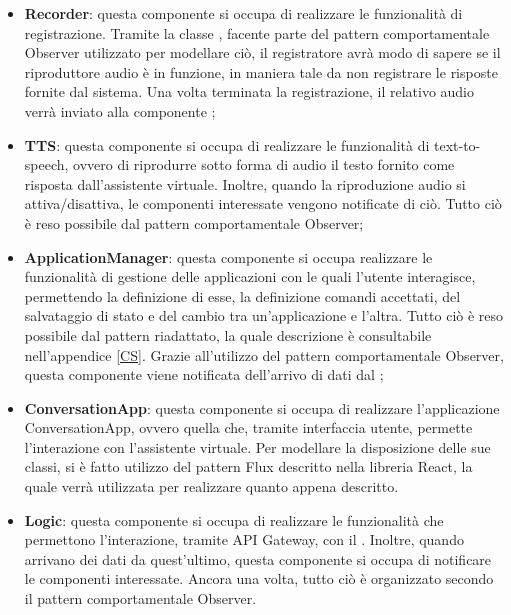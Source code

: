 \begin{itemize}
	\item \textbf{Recorder}: questa componente si occupa di realizzare le funzionalità di registrazione. Tramite la classe , facente parte del pattern comportamentale Observer utilizzato per modellare ciò, il registratore avrà modo di sapere se il riproduttore audio è in funzione, in maniera tale da non registrare le risposte fornite dal sistema. Una volta terminata la registrazione, il relativo audio verrà inviato alla componente ;
	\newpage
	\item \textbf{TTS}: questa componente si occupa di realizzare le funzionalità di text-to-speech, ovvero di riprodurre sotto forma di audio il testo fornito come risposta dall'assistente virtuale. Inoltre, quando la riproduzione audio si attiva/disattiva, le componenti interessate vengono notificate di ciò. Tutto ciò è reso possibile dal pattern comportamentale Observer;
	\item \textbf{ApplicationManager}: questa componente si occupa realizzare le funzionalità di gestione delle applicazioni con le quali l'utente interagisce, permettendo la definizione di esse, la definizione comandi accettati, del salvataggio di stato e del cambio tra un'applicazione e l'altra. Tutto ciò è reso possibile dal pattern  riadattato, la quale descrizione è consultabile nell'appendice \ref{CS}. Grazie all'utilizzo del pattern comportamentale Observer, questa componente viene notificata dell'arrivo di dati dal ;
	\item \textbf{ConversationApp}: questa componente si occupa di realizzare l'applicazione ConversationApp, ovvero quella che, tramite interfaccia utente, permette l'interazione con l'assistente virtuale. Per modellare la disposizione delle sue classi, si è fatto utilizzo del pattern Flux descritto nella libreria React, la quale verrà utilizzata per realizzare quanto appena descritto.
	\item \textbf{Logic}: questa componente si occupa di realizzare le funzionalità che permettono l'interazione, tramite API Gateway, con il . Inoltre, quando arrivano dei dati da quest'ultimo, questa componente si occupa di notificare le componenti interessate. Ancora una volta, tutto ciò è organizzato secondo il pattern comportamentale Observer.
\end{itemize}
